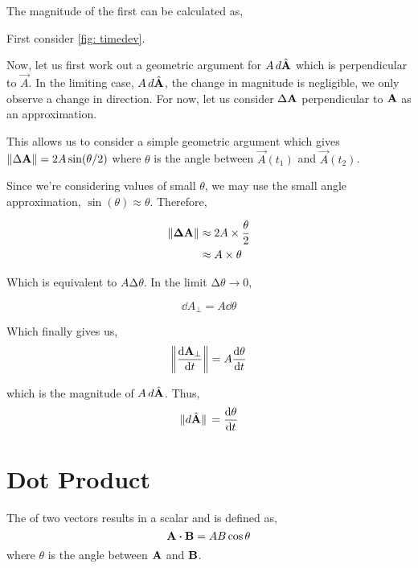 The magnitude of the first can be calculated as,

First consider \cref{fig: timedev}.

Now, let us first work out a geometric argument for \(A\mathop{}\!{d}{\hat{\boldsymbol{\mathbf{A}}}}\)
which is perpendicular to \(\vec{A}\). In the limiting case, \(A\mathop{}\!{d}{\hat{\boldsymbol{\mathbf{A}}}}\),
the change in magnitude is negligible, we only observe a change in direction. For now,
let us consider \(\Delta \boldsymbol{\mathbf{A}}\) perpendicular to \(\boldsymbol{\mathbf{A}}\) as an approximation.

This allows us to consider a simple geometric argument which gives \(\norm{\Delta \boldsymbol{\mathbf{A}}} = 2A\sin(\theta/2)\)
where \(\theta\) is the angle between \(\vec{A}(t_1)\) and \(\vec{A}(t_2)\).

Since we're considering values of small \(\theta\), we may use the small angle approximation,
\(\sin(\theta) \approx \theta\). Therefore,

\begin{marginfigure}
    \centering
    \caption{\(\increment\vec{A} \perp \vec{A}\)}
    \label{fig: timedev}
\end{marginfigure}

\begin{align}
    \norm{\boldsymbol{\mathbf{\Delta A}}} &\approx 2A \times \frac{\theta}{2}\\ 
    &\approx A \times \theta
\end{align}

Which is equivalent to \(A \increment \theta\). In the limit \(\increment \theta \to 0\),

\begin{equation}
    \dd{A_{\perp}} = A \dd{\theta}
\end{equation}

Which finally gives us,
\begin{equation}
    \norm{\dv{\boldsymbol{\mathbf{A}}_{\perp}}{t}} = A\dv{\theta}{t}
\end{equation}

which is the magnitude of \(A\mathop{}\!{d}{\hat{\boldsymbol{\mathbf{A}}}}\). Thus,
\begin{equation}
    \norm*{\mathop{}\!{d}{\hat{\boldsymbol{\mathbf{A}}}}} = \dv{\theta}{t}
\end{equation}

\section{Dot Product}

The  of two vectors results in a scalar and is defined as,
\[\Aa \dtp \BB = AB \cos\theta\]
where \(\theta\) is the angle between \(\boldsymbol{\mathbf{A}}\) and \(\boldsymbol{\mathbf{B}}\). 

